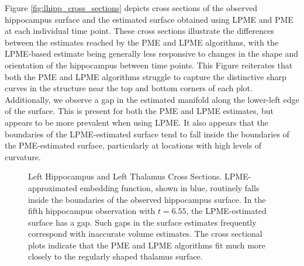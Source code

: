 \documentclass[12pt]{article}
\theoremstyle{definition}
\begin{document}
Figure \ref{fig:lhipp_cross_sections} depicts cross sections of the observed hippocampus surface and the estimated surface obtained using LPME and PME at each individual time point. These cross sections illustrate the differences between the estimates reached by the PME and LPME algorithms, with the LPME-based estimate being generally less responsive to changes in the shape and orientation of the hippocampus between time points. This Figure reiterates that both the PME and LPME algorithms struggle to capture the distinctive sharp curves in the structure near the top and bottom corners of each plot. Additionally, we observe a gap in the estimated manifold along the lower-left edge of the surface. This is present for both the PME and LPME estimates, but appears to be more prevalent when using LPME. It also appears that the boundaries of the LPME-estimated surface tend to fall inside the boundaries of the PME-estimated surface, particularly at locations with high levels of curvature.

\begin{figure}
  \centering
  \hfill
  
  \caption{{\footnotesize Left Hippocampus and Left Thalamus Cross Sections. LPME-approximated embedding function, shown in blue, routinely falls inside the boundaries of the observed hippocampus surface. In the fifth hippocampus observation with $t=6.55$, the LPME-estimated surface has a gap. Such gaps in the surface estimates frequently correspond with inaccurate volume estimates. The cross sectional plots indicate that the PME and LPME algorithms fit much more closely to the regularly shaped thalamus surface.}}
  \label{fig:adni_cross_sections}
\end{figure}
\end{document}
